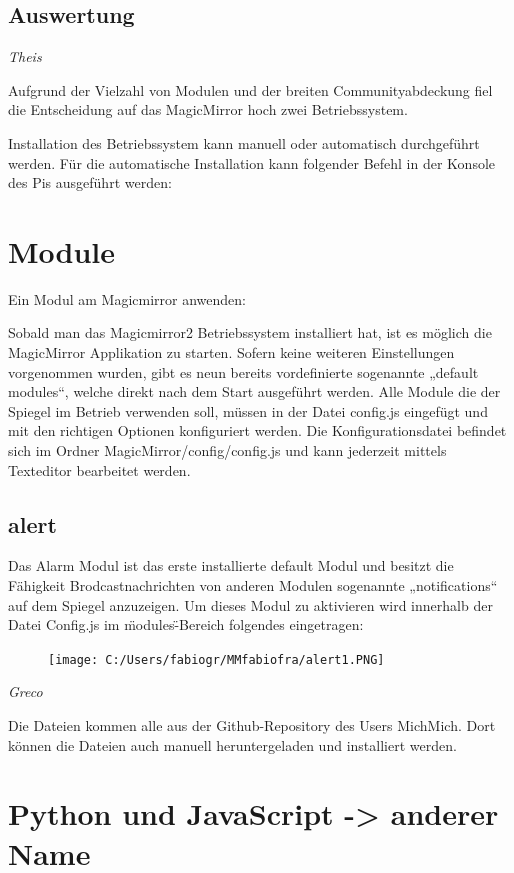 \documentclass[12pt,a4paper]{report}
\begin{document}
\subsection*{Auswertung}

\textit{Theis}


Aufgrund der Vielzahl von Modulen und der breiten Communityabdeckung fiel die Entscheidung auf das MagicMirror hoch zwei Betriebssystem. 


Installation des Betriebssystem kann manuell oder automatisch durchgeführt werden. 
Für die automatische Installation kann folgender Befehl in der Konsole des Pis ausgeführt werden:


\section{Module}
Ein Modul am Magicmirror anwenden:

Sobald man das Magicmirror2 Betriebssystem installiert hat, ist es möglich die MagicMirror Applikation zu starten. Sofern keine weiteren Einstellungen vorgenommen wurden, gibt es neun bereits vordefinierte sogenannte „default modules“, welche direkt nach dem Start ausgeführt werden.  
Alle Module die der Spiegel im Betrieb verwenden soll, müssen in der Datei config.js eingefügt und mit den richtigen Optionen konfiguriert werden. Die Konfigurationsdatei befindet sich im Ordner MagicMirror/config/config.js und kann jederzeit mittels Texteditor bearbeitet werden.
\subsection{alert}
Das Alarm Modul ist das erste installierte default Modul und besitzt die Fähigkeit Brodcastnachrichten von anderen Modulen sogenannte „notifications“ auf dem Spiegel anzuzeigen. Um dieses Modul zu aktivieren wird innerhalb der Datei Config.js im \"modules\"-Bereich folgendes eingetragen:
\begin{figure}[h!]
	\centering
		\texttt{[image: C:/Users/fabiogr/MMfabiofra/alert1.PNG]}
	\label{fig:alert1}
\end{figure}


\textit{Greco}


Die Dateien kommen alle aus der Github-Repository des Users MichMich. Dort können die Dateien auch manuell heruntergeladen und installiert werden. 
\section{Python und JavaScript -> anderer Name}
\end{document}
